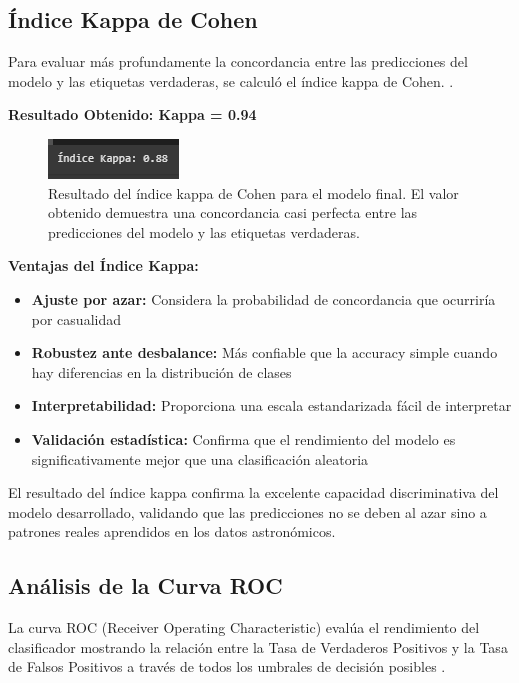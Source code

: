 \documentclass{article}
\begin{document}
\subsection{Índice Kappa de Cohen}

Para evaluar más profundamente la concordancia entre las predicciones del modelo y las etiquetas verdaderas, se calculó el índice kappa de Cohen. \cite{cohen_kappa}.

\textbf{Resultado Obtenido: Kappa = 0.94}

\begin{figure}[H]
    \centering
    \includegraphics[width=0.4\linewidth]{kappa.png}
    \caption{Resultado del índice kappa de Cohen para el modelo final. El valor obtenido demuestra una concordancia casi perfecta entre las predicciones del modelo y las etiquetas verdaderas.}
    \label{fig:kappa}
\end{figure}

\textbf{Ventajas del Índice Kappa:}
\begin{itemize}
    \item \textbf{Ajuste por azar:} Considera la probabilidad de concordancia que ocurriría por casualidad
    \item \textbf{Robustez ante desbalance:} Más confiable que la accuracy simple cuando hay diferencias en la distribución de clases
    \item \textbf{Interpretabilidad:} Proporciona una escala estandarizada fácil de interpretar
    \item \textbf{Validación estadística:} Confirma que el rendimiento del modelo es significativamente mejor que una clasificación aleatoria
\end{itemize}

El resultado del índice kappa confirma la excelente capacidad discriminativa del modelo desarrollado, validando que las predicciones no se deben al azar sino a patrones reales aprendidos en los datos astronómicos.

\subsection{Análisis de la Curva ROC}

La curva ROC (Receiver Operating Characteristic) evalúa el rendimiento del clasificador mostrando la relación entre la Tasa de Verdaderos Positivos y la Tasa de Falsos Positivos a través de todos los umbrales de decisión posibles \cite{roc_analysis}.
\end{document}
